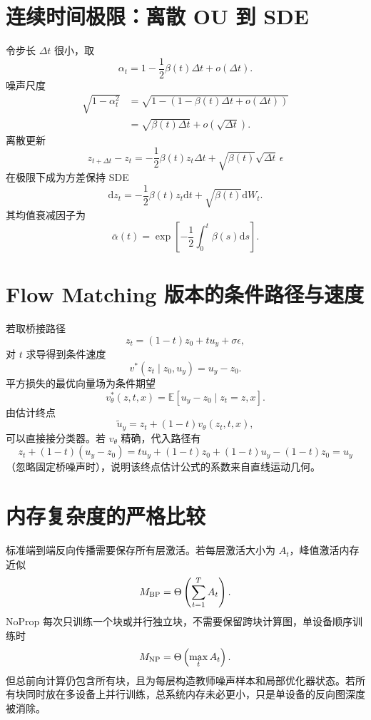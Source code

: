 \documentclass[UTF8,12pt,a4paper,fontset=none]{ctexart}
\numberwithin{equation}{section}
\newcommand{\E}{\mathbb{E}}
\newcommand{\dd}{\mathrm{d}}
\begin{document}
\section{连续时间极限：离散 OU 到 SDE}
令步长 $\Delta t$ 很小，取
\begin{equation}
 \alpha_t=1-\frac12\beta(t)\Delta t+o(\Delta t).
\end{equation}
噪声尺度
\begin{align}
 \sqrt{1-\alpha_t^2}
 &=\sqrt{1-\left(1-\beta(t)\Delta t+o(\Delta t)\right)}\\
 &=\sqrt{\beta(t)\Delta t}+o(\sqrt{\Delta t}).
\end{align}
离散更新
\begin{equation}
 z_{t+\Delta t}-z_t
 =-\frac12\beta(t)z_t\Delta t
 +\sqrt{\beta(t)}\sqrt{\Delta t}\,\epsilon
\end{equation}
在极限下成为方差保持 SDE
\begin{equation}
 \dd z_t=-\frac12\beta(t)z_t\dd t+\sqrt{\beta(t)}\dd W_t.
\end{equation}
其均值衰减因子为
\begin{equation}
 \bar\alpha(t)=\exp\left[-\frac12\int_0^t\beta(s)\dd s\right].
\end{equation}

\section{Flow Matching 版本的条件路径与速度}
若取桥接路径
\begin{equation}
 z_t=(1-t)z_0+t u_y+\sigma\epsilon,
\end{equation}
对 $t$ 求导得到条件速度
\begin{equation}
 v^*(z_t\mid z_0,u_y)=u_y-z_0.
\end{equation}
平方损失的最优向量场为条件期望
\begin{equation}
 v_\theta^*(z,t,x)=\E[u_y-z_0\mid z_t=z,x].
\end{equation}
由估计终点
\begin{equation}
 \widetilde u_y=z_t+(1-t)v_\theta(z_t,t,x),
\end{equation}
可以直接接分类器。若 $v_\theta$ 精确，代入路径有
\begin{equation}
 z_t+(1-t)(u_y-z_0)=t u_y+(1-t)z_0+(1-t)u_y-(1-t)z_0=u_y
\end{equation}
（忽略固定桥噪声时），说明该终点估计公式的系数来自直线运动几何。

\section{内存复杂度的严格比较}
标准端到端反向传播需要保存所有层激活。若每层激活大小为 $A_t$，峰值激活内存近似
\begin{equation}
 M_{\rm BP}=\Theta\left(\sum_{t=1}^{T}A_t\right).
\end{equation}
NoProp 每次只训练一个块或并行独立块，不需要保留跨块计算图，单设备顺序训练时
\begin{equation}
 M_{\rm NP}=\Theta\left(\max_t A_t\right).
\end{equation}
但总前向计算仍包含所有块，且为每层构造教师噪声样本和局部优化器状态。若所有块同时放在多设备上并行训练，总系统内存未必更小，只是单设备的反向图深度被消除。
\end{document}
